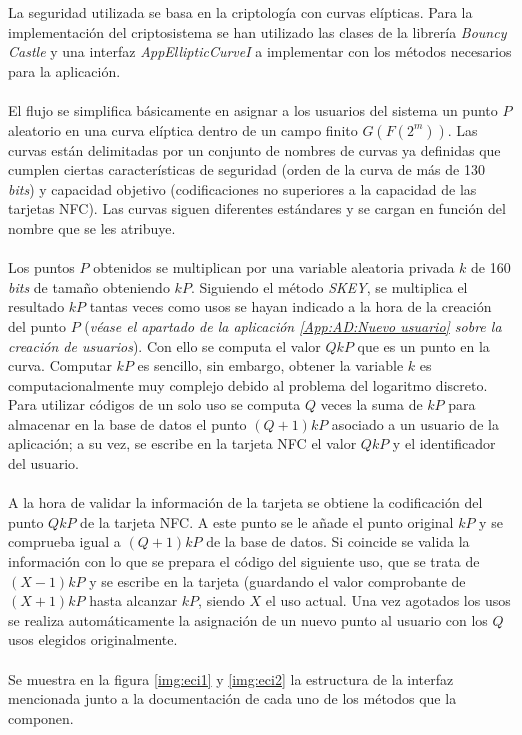 \documentclass[../PFC.tex]{subfiles}
\begin{document}
La seguridad utilizada se basa en la criptología con curvas elípticas. Para la implementación del criptosistema se han utilizado las clases de la librería \textit{Bouncy Castle} y una interfaz \textit{AppEllipticCurveI} a implementar con los métodos necesarios para la aplicación.
\\\\
El flujo se simplifica básicamente en asignar a los usuarios del sistema un punto $P$ aleatorio en una curva elíptica dentro de un campo finito $G(F(2^m))$. Las curvas están delimitadas por un conjunto de nombres de curvas ya definidas que cumplen ciertas características de seguridad (orden de la curva de más de 130 \textit{bits}) y capacidad objetivo (codificaciones no superiores a la capacidad de las tarjetas NFC). Las curvas siguen diferentes estándares y se cargan en función del nombre que se les atribuye.
\\\\
Los puntos $P$ obtenidos se multiplican por una variable aleatoria privada $k$ de 160 \textit{bits} de tamaño obteniendo $kP$. Siguiendo el método \textit{SKEY}, se multiplica el resultado $kP$ tantas veces como usos se hayan indicado a la hora de la creación del punto $P$ (\textit{véase el apartado de la aplicación \ref{App:AD:Nuevo usuario} sobre la creación de usuarios}). Con ello se computa el valor $QkP$ que es un punto en la curva. Computar $kP$ es sencillo, sin embargo, obtener la variable $k$ es computacionalmente muy complejo debido al problema del logaritmo discreto. Para utilizar códigos de un solo uso se computa $Q$ veces la suma de $kP$ para almacenar en la base de datos el punto $(Q+1)kP$ asociado a un usuario de la aplicación; a su vez, se escribe en la tarjeta NFC el valor $QkP$ y el identificador del usuario.
\\\\
A la hora de validar la información de la tarjeta se obtiene la codificación del punto $QkP$ de la tarjeta NFC. A este punto se le añade el punto original $kP$ y se comprueba igual a $(Q+1)kP$ de la base de datos. Si coincide se valida la información con lo que se prepara el código del siguiente uso, que se trata de $(X-1)kP$ y se escribe en la tarjeta (guardando el valor comprobante de $(X+1)kP$ hasta alcanzar $kP$, siendo $X$ el uso actual. Una vez agotados los usos se realiza automáticamente la asignación de un nuevo punto al usuario con los $Q$ usos elegidos originalmente.
\\\\
Se muestra en la figura \ref{img:eci1} y \ref{img:eci2} la estructura de la interfaz mencionada junto a la documentación de cada uno de los métodos que la componen.
 
\end{document}
